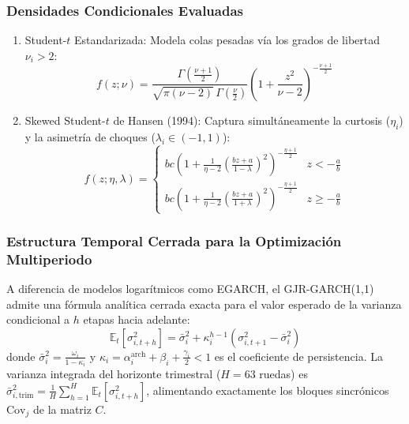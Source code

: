 \documentclass[11pt,a4paper]{article}
\begin{document}
\subsubsection{Densidades Condicionales Evaluadas}
\begin{enumerate}
    \item Student-$t$ Estandarizada: Modela colas pesadas vía los grados de libertad $\nu_i > 2$:
    \begin{equation}
        f(z; \nu) = \frac{\Gamma\left(\frac{\nu+1}{2}\right)}{\sqrt{\pi(\nu-2)}\,\Gamma\left(\frac{\nu}{2}\right)} \left(1 + \frac{z^2}{\nu-2}\right)^{-\frac{\nu+1}{2}}
    \end{equation}
    \item Skewed Student-$t$ de Hansen (1994): Captura simultáneamente la curtosis ($\eta_i$) y la asimetría de choques ($\lambda_i \in (-1, 1)$):
    \begin{equation}
        f(z; \eta, \lambda) = 
        \begin{cases}
            b c \left(1 + \frac{1}{\eta-2}\left(\frac{b z + a}{1 - \lambda}\right)^2\right)^{-\frac{\eta+1}{2}} & z < -\frac{a}{b} \\
            b c \left(1 + \frac{1}{\eta-2}\left(\frac{b z + a}{1 + \lambda}\right)^2\right)^{-\frac{\eta+1}{2}} & z \ge -\frac{a}{b}
        \end{cases}
    \end{equation}
\end{enumerate}

\subsubsection{Estructura Temporal Cerrada para la Optimización Multiperiodo}
A diferencia de modelos logarítmicos como EGARCH, el GJR-GARCH(1,1) admite una fórmula analítica cerrada exacta para el valor esperado de la varianza condicional a $h$ etapas hacia adelante:
\begin{equation}
    \mathbb{E}_t\left[\sigma_{i, t+h}^2\right] = \bar{\sigma}_i^2 + \kappa_i^{h-1} \left(\sigma_{i, t+1}^2 - \bar{\sigma}_i^2\right)
\end{equation}
donde $\bar{\sigma}_i^2 = \frac{\omega_i}{1 - \kappa_i}$ y $\kappa_i = \alpha_i^{\mathrm{arch}} + \beta_i + \frac{\gamma_i}{2} < 1$ es el coeficiente de persistencia. La varianza integrada del horizonte trimestral ($H = 63$ ruedas) es $\bar{\sigma}_{i,\mathrm{trim}}^2 = \frac{1}{H}\sum_{h=1}^H \mathbb{E}_t[\sigma_{i,t+h}^2]$, alimentando exactamente los bloques sincrónicos $\mathrm{Cov}_j$ de la matriz $C$.
\end{document}
